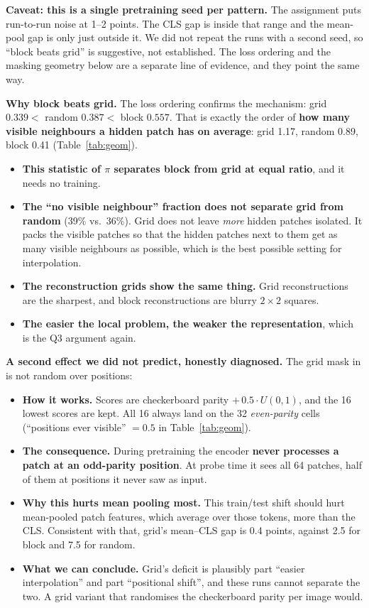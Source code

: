 \documentclass[11pt]{article}
\newcommand{\run}[1]{\texttt{\detokenize{#1}}}
\begin{document}
\textbf{Caveat: this is a single pretraining seed per pattern.} The assignment puts run-to-run noise at 1--2 points. The CLS gap is inside that range and the mean-pool gap is only just outside it. We did not repeat the runs with a second seed, so ``block beats grid'' is suggestive, not established. The loss ordering and the masking geometry below are a separate line of evidence, and they point the same way.

\textbf{Why block beats grid.} The loss ordering confirms the mechanism: grid $0.339<$ random $0.387<$ block $0.557$. That is exactly the order of \textbf{how many visible neighbours a hidden patch has on average}: grid 1.17, random 0.89, block 0.41 (Table~\ref{tab:geom}).
\begin{itemize}
  \item \textbf{This statistic of $\pi$ separates block from grid at equal ratio}, and it needs no training.
  \item \textbf{The ``no visible neighbour'' fraction does not separate grid from random} (39\% vs.\ 36\%). Grid does not leave \emph{more} hidden patches isolated. It packs the visible patches so that the hidden patches next to them get as many visible neighbours as possible, which is the best possible setting for interpolation.
  \item \textbf{The reconstruction grids show the same thing.} Grid reconstructions are the sharpest, and block reconstructions are blurry $2\times2$ squares.
  \item \textbf{The easier the local problem, the weaker the representation}, which is the Q3 argument again.
\end{itemize}

\textbf{A second effect we did not predict, honestly diagnosed.} The grid mask in \run{masking.py} is not random over positions:
\begin{itemize}
  \item \textbf{How it works.} Scores are checkerboard parity $+\,0.5\cdot U(0,1)$, and the 16 lowest scores are kept. All 16 always land on the 32 \emph{even-parity} cells (``positions ever visible'' $=0.5$ in Table~\ref{tab:geom}).
  \item \textbf{The consequence.} During pretraining the encoder \textbf{never processes a patch at an odd-parity position}. At probe time it sees all 64 patches, half of them at positions it never saw as input.
  \item \textbf{Why this hurts mean pooling most.} This train/test shift should hurt mean-pooled patch features, which average over those tokens, more than the CLS. Consistent with that, grid's mean--CLS gap is 0.4 points, against 2.5 for block and 7.5 for random.
  \item \textbf{What we can conclude.} Grid's deficit is plausibly part ``easier interpolation'' and part ``positional shift'', and these runs cannot separate the two. A grid variant that randomises the checkerboard parity per image would.
\end{itemize}
\end{document}
